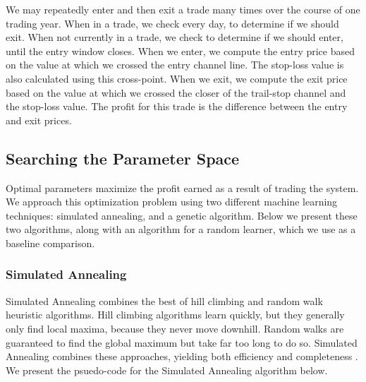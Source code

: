 \documentclass[12pt]{article}
\begin{document}
\pagebreak
We may repeatedly enter and then exit a trade many times over the course of one
trading year. When in a trade, we check every day, to determine if we should
exit.  When not currently in a trade, we check to determine if we should enter,
until the entry window closes. When we enter, we compute the entry price based
on the value at which we crossed the entry channel line. The stop-loss value is
also calculated using this cross-point. When we exit, we compute the exit price
based on the value at which we crossed the closer of the trail-stop channel and
the stop-loss value. The profit for this trade is the difference between the
entry and exit prices.

\subsection{Searching the Parameter Space}

Optimal parameters maximize the profit earned as a result of trading the
system.  We approach this optimization problem using two different machine
learning techniques: simulated annealing, and a genetic algorithm.  Below we
present these two algorithms, along with an algorithm for a random learner,
which we use as a baseline comparison.

\subsubsection{Simulated Annealing}

Simulated Annealing combines the best of hill climbing and random walk
heuristic algorithms.  Hill climbing algorithms learn quickly, but they
generally only find local maxima, because they never move downhill. Random
walks are guaranteed to find the global maximum but take far too long to do so.
Simulated Annealing combines these approaches, yielding both efficiency and
completeness \cite{RussellNorvig}.  We present the psuedo-code for the Simulated Annealing algorithm
below.
\end{document}
